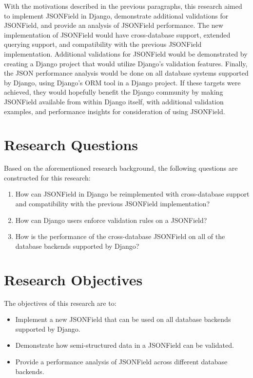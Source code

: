 With the motivations described in the previous paragraphs, this research aimed
to implement JSONField in Django, demonstrate additional validations for
JSONField, and provide an analysis of JSONField performance. The new
implementation of JSONField would have cross-database support, extended
querying support, and compatibility with the previous JSONField implementation.
Additional validations for JSONField would be demonstrated by creating a Django
project that would utilize Django's validation features. Finally, the JSON
performance analysis would be done on all database systems supported by Django,
using Django's ORM tool in a Django project. If these targets were achieved,
they would hopefully benefit the Django community by making JSONField available
from within Django itself, with additional validation examples, and performance
insights for consideration of using JSONField.

\section{Research Questions}

Based on the aforementioned research background, the following questions are
constructed for this research:

\begin{enumerate}
    \item How can JSONField in Django be reimplemented with cross-database
          support and compatibility with the previous JSONField implementation?
    \item How can Django users enforce validation rules on a JSONField?
    \item How is the performance of the cross-database JSONField on all of the
          database backends supported by Django?
\end{enumerate}

\section{Research Objectives}

The objectives of this research are to:

\begin{itemize}
    \item Implement a new JSONField that can be used on all database backends
          supported by Django.
    \item Demonstrate how semi-structured data in a JSONField can be validated.
    \item Provide a performance analysis of JSONField across different database
          backends.
\end{itemize}

